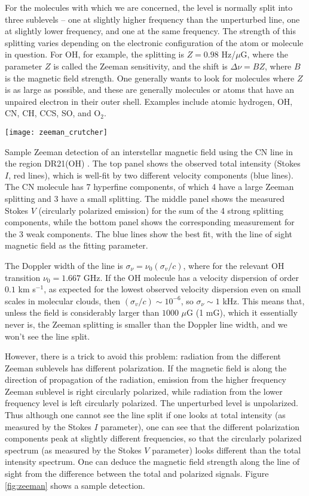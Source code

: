 For the molecules with which we are concerned, the level is normally split into three sublevels -- one at slightly higher frequency than the unperturbed line, one at slightly lower frequency, and one at the same frequency. The strength of this splitting varies depending on the electronic configuration of the atom or molecule in question. For OH, for example, the splitting is $Z=0.98$ Hz/$\mu$G, where the parameter $Z$ is called the Zeeman sensitivity, and the shift is $\Delta \nu = BZ$, where $B$ is the magnetic field strength. One generally wants to look for molecules where $Z$ is as large as possible, and these are generally molecules or atoms that have an unpaired electron in their outer shell. Examples include atomic hydrogen, OH, CN, CH, CCS, SO, and O$_2$.

\begin{marginfigure}
\texttt{[image: zeeman\_crutcher]}
\caption[Sample Zeeman detection of a magnetic field]{
\label{fig:zeeman}
Sample Zeeman detection of an interstellar magnetic field using the CN line in the region DR21(OH) \citep{crutcher12a}. The top panel shows the observed total intensity (Stokes $I$, red lines), which is well-fit by two different velocity components (blue lines). The CN molecule has 7 hyperfine components, of which 4 have a large Zeeman splitting and 3 have a small splitting. The middle panel shows the measured Stokes $V$ (circularly polarized emission) for the sum of the 4 strong splitting components, while the bottom panel shows the corresponding measurement for the 3 weak components. The blue lines show the best fit, with the line of sight magnetic field as the fitting parameter.
}
\end{marginfigure}
The Doppler width of the line is $\sigma_{\nu} = \nu_0 (\sigma_v/c)$, where for the relevant OH transition $\nu_0=1.667$ GHz. If the OH molecule has a velocity dispersion of order $0.1$ km s$^{-1}$, as expected for the lowest observed velocity dispersion even on small scales in molecular clouds, then $(\sigma_v/c)\sim 10^{-6}$, so $\sigma_{\nu} \sim 1$ kHz. This means that, unless the field is considerably larger than $1000$ $\mu$G (1 mG), which it essentially never is, the Zeeman splitting is smaller than the Doppler line width, and we won't see the line split.

However, there is a trick to avoid this problem: radiation from the different Zeeman sublevels has different polarization. If the magnetic field is along the direction of propagation of the radiation, emission from the higher frequency Zeeman sublevel is right circularly polarized, while radiation from the lower frequency level is left circularly polarized. The unperturbed level is unpolarized. Thus although one cannot see the line split if one looks at total intensity (as measured by the Stokes $I$ parameter), one can see that the different polarization components peak at slightly different frequencies, so that the circularly polarized spectrum (as measured by the Stokes $V$ parameter) looks different than the total intensity spectrum. One can deduce the magnetic field strength along the line of sight from the difference between the total and polarized signals. Figure \ref{fig:zeeman} shows a sample detection.

